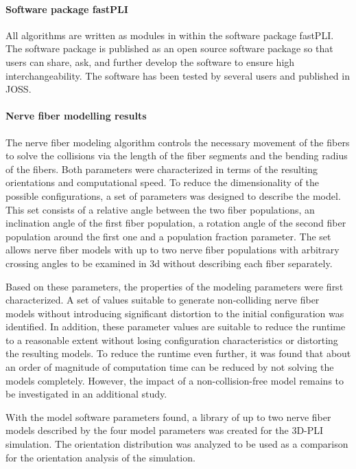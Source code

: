 \paragraph{Software package \acs{fastPLI}}
% 
All algorithms are written as modules in \python{} within the software package \ac{fastPLI}.
The software package is published as an open source software package so that users can share, ask, and further develop the software to ensure high interchangeability. 
The software has been tested by several users and published in \ac{JOSS}.
% 
% 
% 
\paragraph{Nerve fiber modelling results}
% 
The nerve fiber modeling algorithm controls the necessary movement of the fibers to solve the collisions via the length of the fiber segments and the bending radius of the fibers.
Both parameters were characterized in terms of the resulting orientations and computational speed.
To reduce the dimensionality of the possible configurations, a set of parameters was designed to describe the model.
This set consists of a relative angle between the two fiber populations, an inclination angle of the first fiber population, a rotation angle of the second fiber population around the first one and a population fraction parameter.
The set allows nerve fiber models with up to two nerve fiber populations with arbitrary crossing angles to be examined in 3d without describing each fiber separately.
\par
% 
Based on these parameters, the properties of the modeling parameters were first characterized.
A set of values suitable to generate non-colliding nerve fiber models without introducing significant distortion to the initial configuration was identified.
In addition, these parameter values are suitable to reduce the runtime to a reasonable extent without losing configuration characteristics or distorting the resulting models.
To reduce the runtime even further, it was found that about an order of magnitude of computation time can be reduced by not solving the models completely.
However, the impact of a non-collision-free model remains to be investigated in an additional study.
\par
% 
With the model software parameters found, a library of up to two nerve fiber models described by the four model parameters was created for the \ac{3D-PLI} simulation.
The orientation distribution was analyzed to be used as a comparison for the orientation analysis of the simulation.
% 
% 
% 
